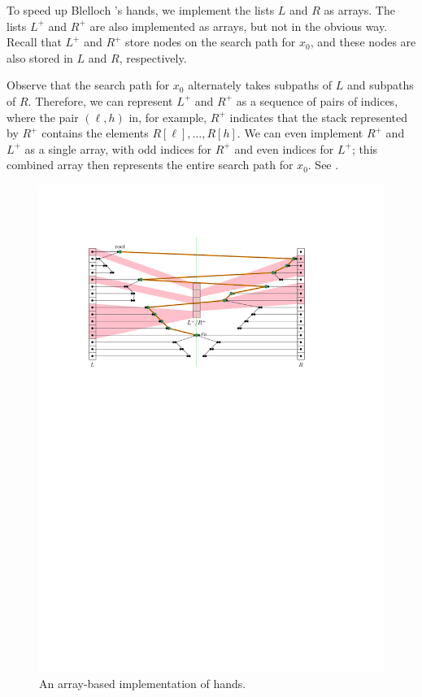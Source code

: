 \documentclass{patmorin}
\makeatletter
\def\ScaleIfNeeded{%
\ifdim\Gin@nat@width>.97\linewidth
.97\linewidth
\else
\Gin@nat@width
\fi
}
\makeatother
\begin{document}
To speed up Blelloch \etal's hands, we implement the lists $L$ and $R$
as arrays.  The lists $L^+$ and $R^+$ are also implemented as arrays,
but not in the obvious way.  Recall that $L^+$ and $R^+$ store nodes
on the search path for $x_0$, and these nodes are also stored in $L$
and $R$, respectively.

Observe that the search path for $x_0$ alternately takes subpaths of
$L$ and subpaths of $R$.  Therefore, we can represent $L^+$ and $R^+$
as a sequence of pairs of indices, where the pair $(\ell,h)$ in, for
example, $R^+$ indicates that the stack represented by $R^+$ contains the
elements $R[\ell],\ldots,R[h]$.  We can even implement $R^+$ and $L^+$
as a single array, with odd indices for $R^+$ and even indices for $L^+$;
this combined array then represents the entire search path for $x_0$. See
.

\begin{figure}
  \begin{center}
    \includegraphics[width=\ScaleIfNeeded]{fast-hand}
  \end{center}
  \caption{An array-based implementation of hands.}
\end{figure}
\end{document}
